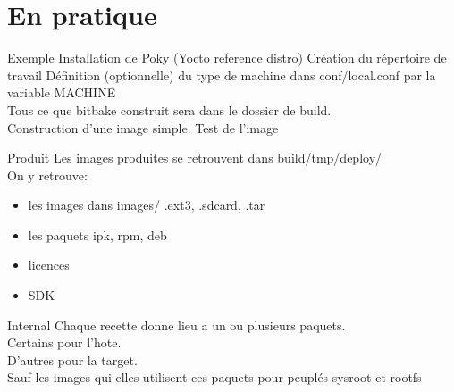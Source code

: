 \section{En pratique}




	
\begin{frame}{Exemple}{}
	Installation de Poky (Yocto reference distro)
	\gitclone
	Création du répertoire de travail
	\yoctoinit
	Définition (optionnelle) du type de machine dans conf/local.conf par la variable MACHINE\\
	Tous ce que bitbake construit sera dans le dossier de build.\\
	Construction d'une image simple.
	\yoctobuild
	Test de l'image
	\yoctotest
\end{frame}

\begin{frame}{Produit}{}
	Les images produites se retrouvent dans build/tmp/deploy/\\
	On y retrouve:
	\begin{itemize}
		\item
			les images dans images/ .ext3, .sdcard, .tar
		\item
			les paquets ipk, rpm, deb
		\item
			licences
		\item
			SDK
	\end{itemize}
\end{frame}

\begin{frame}{Internal}{}
	Chaque recette donne lieu a un ou plusieurs paquets.\\
	Certains pour l'hote.\\
	D'autres pour la target.\\
	Sauf les images qui elles utilisent ces paquets pour peuplés sysroot et rootfs\\
\end{frame}